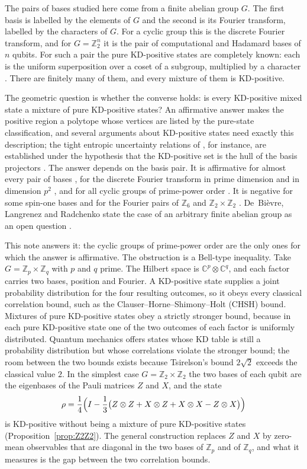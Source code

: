 \documentclass[11pt,a4paper]{article}
\theoremstyle{definition}
\theoremstyle{plain}
\newcommand{\C}{\mathbb C}
\newcommand{\Z}{\mathbb Z}
\begin{document}
The pairs of bases studied here come from a finite abelian group $G$. The
first basis is labelled by the elements of $G$ and the second is its Fourier
transform, labelled by the characters of $G$. For a cyclic group this is the
discrete Fourier transform, and for $G=\Z_2^n$ it is the pair of
computational and Hadamard bases of $n$ qubits. For such a pair the pure
KD-positive states are completely known: each is the uniform superposition
over a coset of a subgroup, multiplied by a character \cite{DLR}. There are
finitely many of them, and every mixture of them is KD-positive.

The geometric question is whether the converse holds: is every KD-positive
mixed state a mixture of pure KD-positive states? An affirmative answer makes
the positive region a polytope whose vertices are listed by the pure-state
classification, and several arguments about KD-positive states need exactly
this description; the tight entropic uncertainty relations of
\cite{ThioEntropic}, for instance, are established under the hypothesis that
the KD-positive set is the hull of the basis projectors
\cite[Lemma~2]{ThioEntropic}. The answer depends on the basis pair. It is
affirmative for almost every pair of bases \cite{almost}, for the discrete
Fourier transform in prime dimension \cite{LAD} and in dimension $p^2$
\cite{Yang}, and for all cyclic groups of prime-power order \cite{DLR}. It is negative for some spin-one
bases \cite{LAD,convexroof} and for the Fourier pairs of $\Z_6$ and
$\Z_2\times\Z_2$ \cite{DLR}. De~Bi\`evre, Langrenez and Radchenko state the
case of an arbitrary finite abelian group as an open question
\cite[Section~8]{DLR}.

This note answers it: the cyclic groups of prime-power order are the only
ones for which the answer is affirmative. The obstruction is a Bell-type
inequality. Take $G=\Z_p\times\Z_q$ with $p$ and $q$ prime. The Hilbert space
is $\C^p\otimes\C^q$, and each factor carries two bases, position and Fourier.
A KD-positive state supplies a joint probability distribution for the four
resulting outcomes, so it obeys every classical correlation bound, such as
the Clauser--Horne--Shimony--Holt (CHSH) bound. Mixtures of pure KD-positive
states obey a strictly stronger bound, because in each pure KD-positive state
one of the two outcomes of each factor is uniformly distributed. Quantum
mechanics offers states whose KD table is still a probability distribution
but whose correlations violate the stronger bound; the room between the two
bounds exists because Tsirelson's bound $2\sqrt2$ exceeds the classical value
$2$. In the simplest case $G=\Z_2\times\Z_2$ the two bases of each qubit are
the eigenbases of the Pauli matrices $Z$ and $X$, and the state
\begin{equation}\label{eq:qubits}
 \rho=\frac14\Bigl(I-\frac13\bigl(Z\otimes Z+X\otimes Z+X\otimes X
 -Z\otimes X\bigr)\Bigr)
\end{equation}
is KD-positive without being a mixture of pure KD-positive states
(Proposition~\ref{prop:Z2Z2}). The general construction replaces $Z$ and $X$
by zero-mean observables that are diagonal in the two bases of $\Z_p$ and of
$\Z_q$, and what it measures is the gap between the two correlation bounds.
\end{document}
